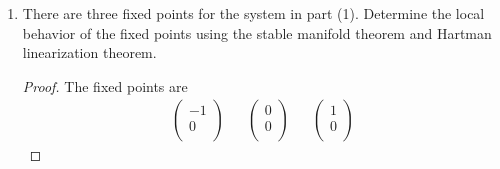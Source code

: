 \documentclass[../psets.tex]{subfiles}
\begin{document}
\begin{enumerate}
\begin{enumerate}
\begin{proof}
\begin{equation*}
{{\begin{pmatrix}
                            y\\
                            z\\
                        \end{pmatrix}
                    }' = {
                        \begin{pmatrix}
                            z\\
                            -bz+y-y^3\\
                        \end{pmatrix}
                    }
                }
            \end{equation*}
            We can derive an energy function as follows.
            \begin{align*}
                0 &= x''+bx'+\underbrace{x^3-x}_{U'(x)}\\
                &= x'x''+b|x'|^2+x'U'(x)\\
                &= \left( \frac{1}{2}(x')^2 \right)'+b|x'|^2+(U(x))'\\
                -b|x'|^2 &= \dv{t}(\frac{1}{2}(x')^2+U(x))
            \end{align*}
            Therefore, the energy function is constantly decreasing.
        \end{proof}
        \item There are three fixed points for the system in part (1). Determine the local behavior of the fixed points using the stable manifold theorem and Hartman linearization theorem.
        \begin{proof}
            The fixed points are
            \begin{align*}
                \begin{pmatrix}
                    -1\\
                    0\\
                \end{pmatrix}&&
                \begin{pmatrix}
                    0\\
                    0\\
                \end{pmatrix}&&
                \begin{pmatrix}
                    1\\
                    0\\
                \end{pmatrix}
            \end{align*}

\end{proof}
\end{enumerate}
\end{enumerate}
\end{document}
